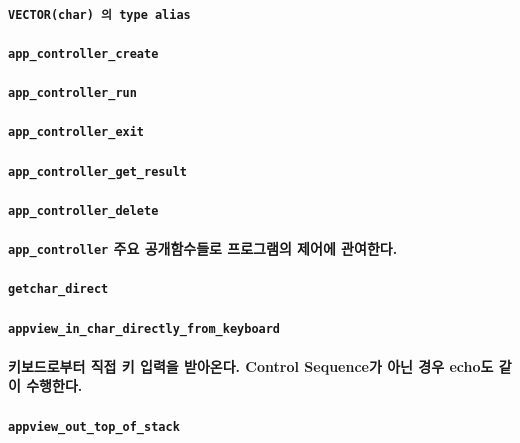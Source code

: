 \documentclass[UTF8]{report}
\begin{document}
            \paragraph{%
                \normalfont \texttt{VECTOR(char) 의 type alias}
            }

            \paragraph{\texttt{app\_controller\_create}}
            \paragraph{\texttt{app\_controller\_run}}
            \paragraph{\texttt{app\_controller\_exit}}
            \paragraph{\texttt{app\_controller\_get\_result}}
            \paragraph{\texttt{app\_controller\_delete}}
            \paragraph{%
                \normalfont \texttt{app\_controller} 주요 공개함수들로 프로그램의 제어에 관여한다.
            }


            \paragraph{\texttt{getchar\_direct}}
            \paragraph{\texttt{appview\_in\_char\_directly\_from\_keyboard}}
            \paragraph{%
                \normalfont 키보드로부터 직접 키 입력을 받아온다. Control Sequence가 아닌 경우 echo도 같이 수행한다.
            }



            \paragraph{\texttt{appview\_out\_top\_of\_stack}}
\end{document}
